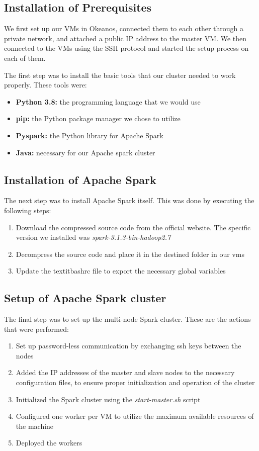 \documentclass[conference]{IEEEtran}
\begin{document}
\subsection{Installation of Prerequisites}

We first set up our VMs in Okeanos, connected them to each other through a private network, and attached a public IP address to the master VM. We then connected to the VMs using the SSH protocol and started the setup process on each of them.

The first step was to install the basic tools that our cluster needed to work properly. These tools were:
\begin{itemize}
\item{\textbf{Python 3.8:} the programming language that we would use}
\item{\textbf{pip:} the Python package manager we chose to utilize}
\item{\textbf{Pyspark:} the Python library for Apache Spark}
\item{\textbf{Java:} necessary for our Apache spark cluster}

\end{itemize}

\subsection{Installation of Apache Spark}

The next step was to install Apache Spark itself. This was done by executing the following steps:
\begin{enumerate}
\item{Download the compressed source code from the official website. The specific version we installed was \textit{spark-3.1.3-bin-hadoop2.7}}
\item{Decompress the source code and place it in the destined folder in our vms}
\item{Update the textit{bashrc} file to export the necessary global variables}
\end{enumerate}

\subsection{Setup of Apache Spark cluster}

The final step was to set up the multi-node Spark cluster. 
These are the actions that were performed:

\begin{enumerate}
    \item {Set up password-less communication by exchanging ssh keys between the nodes}
    \item {Added the IP addresses of the master and slave nodes to the necessary configuration files, to ensure proper initialization and operation of the cluster}
    \item {Initialized the Spark cluster using the \textit{start-master.sh} script}
    \item {Configured one worker per VM to utilize the maximum available resources of the machine}
    \item {Deployed the workers}
\end{enumerate}
\end{document}
